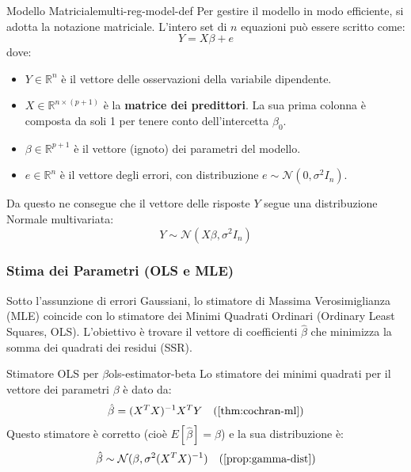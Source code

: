 \begin{definizione}{Modello Matriciale}{multi-reg-model-def}
	Per gestire il modello in modo efficiente, si adotta la notazione
	matriciale. L'intero set di \(n\) equazioni può essere scritto come:
	\[
		Y = X\beta + e
	\]
	dove:
	\begin{itemize}
		\item \(Y \in \mathbb{R}^n\) è il vettore delle osservazioni della
		      variabile dipendente.
		\item \(X \in \mathbb{R}^{n \times (p+1)}\) è la \textbf{matrice dei
			      predittori}. La sua prima colonna è composta da soli 1 per tenere conto
		      dell'intercetta \(\beta_0\).
		\item \(\beta \in \mathbb{R}^{p+1}\) è il vettore (ignoto) dei
		      parametri del modello.
		\item \(e \in \mathbb{R}^n\) è il vettore degli errori, con
		      distribuzione \(e \sim \mathcal{N}(0, \sigma^2 I_n)\).
	\end{itemize}
	Da questo ne consegue che il vettore delle risposte \(Y\) segue una
	distribuzione Normale multivariata:
	\[
		Y \sim \mathcal{N}(X\beta, \sigma^2 I_n)
	\]
\end{definizione}

\subsubsection{Stima dei Parametri (OLS e MLE)}
Sotto l'assunzione di errori Gaussiani, lo stimatore di Massima Verosimiglianza
(MLE) coincide con lo stimatore dei Minimi Quadrati Ordinari (Ordinary Least
Squares, OLS). L'obiettivo è trovare il vettore di coefficienti \(\hat{\beta}\)
che minimizza la somma dei quadrati dei residui (SSR).

\begin{proposizione}{Stimatore OLS per \(\beta\)}{ols-estimator-beta}
	Lo stimatore dei minimi quadrati per il vettore dei parametri \(\beta\) è
	dato da:
	\begin{align*}
		\hat{\beta} = (X^T X)^{-1} X^T Y &  & (\text{\Cref{thm:cochran-ml}})
	\end{align*}
	Questo stimatore è corretto (cioè \(E[\hat{\beta}] = \beta\)) e la sua
	distribuzione è:
	\begin{align*}
		\hat{\beta} \sim \mathcal{N}(\beta, \sigma^2(X^T X)^{-1}) &  &
		(\text{\Cref{prop:gamma-dist}})
	\end{align*}
\end{proposizione}

